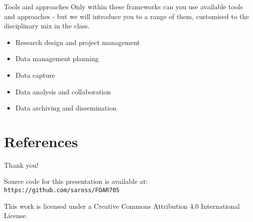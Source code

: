 \documentclass[aspectratio=169, 11pt]{beamer} %
\begin{document}
\begin{frame}{Tools and approaches}
Only within these frameworks can you use available tools and approaches - but we will introduce you to a range of them, customised to the disciplinary mix in the class.
    \begin{itemize}[label=\textbullet]
        \item Research design and project management
        \item Data management planning
        \item Data capture
        \item Data analysis and collaboration
        \item Data archiving and dissemination
    \end{itemize}

\end{frame}

% 


\section{References}

\begin{multicols}{2}[]


\end{multicols}


  
%   
%   


\begin{frame}{Thank you!}


Source code for this presentation is available at: \texttt{https://github.com/saross/FOAR705}

This work is licensed under a Creative Commons Attribution 4.0 International License.

\end{frame}
\end{document}
